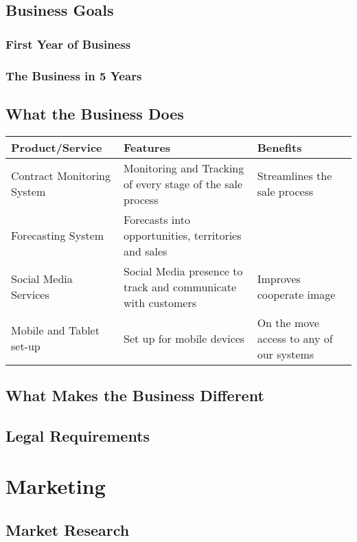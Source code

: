 \documentclass[DIV=calc, paper=a4, fontsize=11pt]{scrartcl}	 %
\begin{document}
\subsection{Business Goals}
\subsubsection*{First Year of Business}
\subsubsection*{The Business in 5 Years}

\subsection{What the Business Does}
\begin{tabular}{|l|p{}|p{}|}\hline
Product/Service & Features & Benefits \\ \hline
Contract Monitoring System & Monitoring and Tracking of every stage of the sale process & Streamlines the sale process \\ \hline
Forecasting System & Forecasts into opportunities, territories and sales &  \\ \hline
Social Media Services & Social Media presence to track and communicate with customers & Improves cooperate image \\ \hline
Mobile and Tablet set-up & Set up for mobile devices & On the move access to any of our systems \\ \hline
\end{tabular}


\subsection{What Makes the Business Different}

\subsection{Legal Requirements}


\section{Marketing}

\subsection{Market Research}
\end{document}
